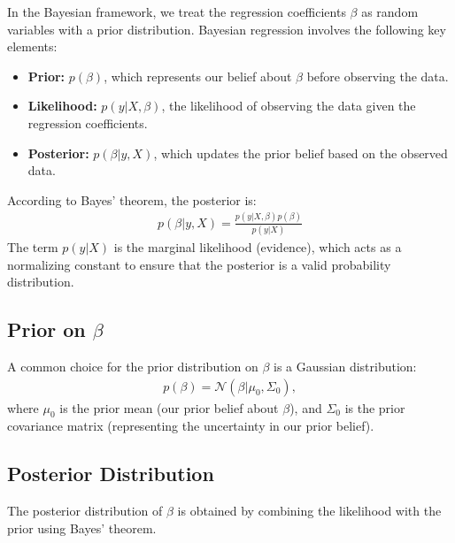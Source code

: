 In the Bayesian framework, we treat the regression coefficients $\beta$ as random variables with a prior distribution. Bayesian regression involves the following key elements:

\begin{itemize}
    \item \textbf{Prior:} $ p(\beta) $, which represents our belief about $\beta$ before observing the data.
    \item \textbf{Likelihood:} $ p(y | X, \beta) $, the likelihood of observing the data given the regression coefficients.
    \item \textbf{Posterior:} $ p(\beta | y, X) $, which updates the prior belief based on the observed data.
\end{itemize}

According to Bayes’ theorem, the posterior is:
\begin{align*}
	p(\beta | y, X) = \frac{p(y | X, \beta) p(\beta)}{p(y | X)}
\end{align*}
The term $ p(y | X) $ is the marginal likelihood (evidence), which acts as a normalizing constant to ensure that the posterior is a valid probability distribution.

\subsection{Prior on $\beta$}

A common choice for the prior distribution on $\beta$ is a Gaussian distribution:
\begin{align*}
	p(\beta) = \mathcal{N}(\beta | \mu_0, \Sigma_0),
\end{align*}
where $\mu_0$ is the prior mean (our prior belief about $\beta$), and $\Sigma_0$ is the prior covariance matrix (representing the uncertainty in our prior belief).

\subsection{Posterior Distribution}
The posterior distribution of $\beta$ is obtained by combining the likelihood with the prior using Bayes' theorem.


